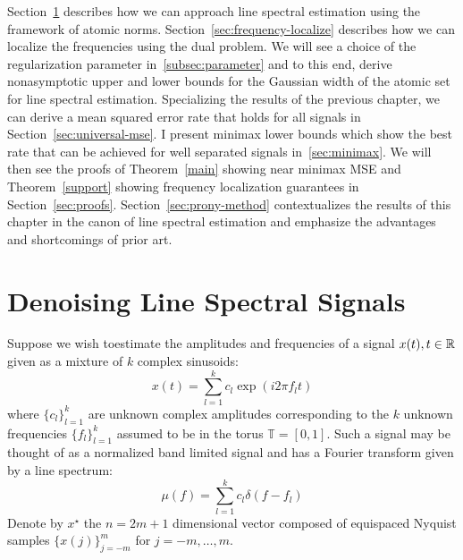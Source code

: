 Section~\ref{sec:denoise-trig-moments} describes how we can approach line
spectral estimation using the framework of atomic norms.
Section~\ref{sec:frequency-localize} describes how we can localize the
frequencies using the dual problem. We will see a choice of the regularization
parameter in~\ref{subsec:parameter} and to this end, derive nonasymptotic upper
and lower bounds for the Gaussian width of the atomic set for line spectral
estimation. Specializing the results of the previous chapter, we can derive a
mean squared error rate that holds for all signals in
Section~\ref{sec:universal-mse}. I present minimax lower bounds which show the
best rate that can be achieved for well separated signals in~\ref{sec:minimax}.
We will then see the proofs of Theorem~\ref{main} showing near minimax MSE and
Theorem~\ref{support} showing frequency localization guarantees in
Section~\ref{sec:proofs}. Section~\ref{sec:prony-method} contextualizes the
results of this chapter in the canon of line spectral estimation and emphasize
the advantages and shortcomings of prior art.



\section{Denoising Line Spectral Signals}
\label{sec:denoise-trig-moments} 

Suppose we wish toestimate the amplitudes and frequencies of a signal $x(t), t
\in \mathbb{R}$ given as a mixture of $k$ complex sinusoids:
\begin{equation*}
  x ( t) =  \sum_{l = 1}^k c_l \exp ( i 2 \pi f_l t)
\end{equation*}
where $\{ c_l \}_{l = 1}^k$ are unknown complex amplitudes corresponding to
the $k$ unknown frequencies $\{ f_l \}_{l = 1}^k$ assumed to be in the torus
$\mathbb{T} = [0, 1]$. Such a signal may be thought of as a normalized band
limited signal and has a Fourier transform given by a line spectrum:
\begin{equation}
\label{mu}
\mu(f) = \sum_{l=1}^k c_l\delta(f - f_l)
\end{equation}
Denote by $x^\star$ the $n = 2m+1$ dimensional vector composed of equispaced 
Nyquist samples $\{x(j)\}_{j=-m}^m$   for $j=-m,\ldots,m$.

